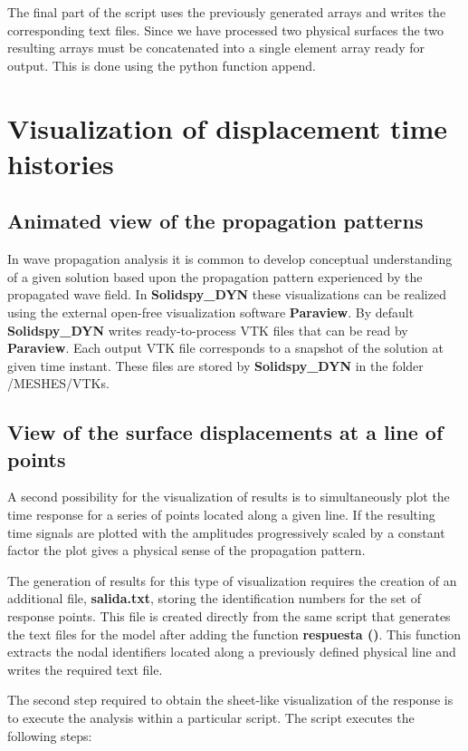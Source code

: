 \documentclass[11pt,letterpaper]{article}
\begin{document}
The final part of the script uses the previously generated arrays and writes the corresponding text files. Since we have processed two physical surfaces the two resulting arrays must be concatenated into a single element array ready for output. This is done using the python function append.

\section{Visualization of displacement time histories}
\subsection*{Animated view of the propagation patterns}
In wave propagation analysis it is common to develop conceptual understanding of a given solution based upon the propagation pattern experienced by the propagated wave field. In {\bf Solidspy\_DYN} these visualizations can be realized  using the external open-free visualization software {\bf Paraview}. By default {\bf Solidspy\_DYN} writes ready-to-process VTK files that can be read by {\bf Paraview}. Each output VTK file corresponds to a snapshot of the solution at given time instant.  These files are stored by {\bf Solidspy\_DYN} in the folder /MESHES/VTKs.

\subsection*{View of the surface displacements at a line of points}
A second possibility for the visualization of results is to simultaneously plot the time response for a series of points located along a given line. If the resulting time signals are plotted with the amplitudes progressively scaled by a constant factor the plot gives a physical sense of the propagation pattern.

The generation of results for this type of visualization requires the creation of an additional file, {\bf salida.txt}, storing the identification numbers for the set of response points. This file is created directly from the same script that generates the text files for the model after adding the function {\bf respuesta ()}. This function extracts the nodal identifiers located along a previously defined physical line and writes the required text file.

The second step required to obtain the sheet-like visualization of the response is to execute the analysis within a particular script. The script executes the following steps:
\end{document}
